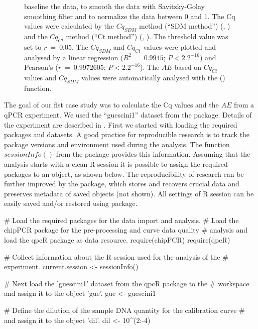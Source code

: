 \begin{figure}[htbp]
{baseline the data, to smooth the data with Savitzky-Golay smoothing filter and 
to normalize the data between 0 and 1.  The Cq values were 
calculated by the $Cq_{SDM}$ method (``SDM method'') (, 
) and the $Cq_{Ct}$ method (``Ct method'') (, 
). The threshold value was set to $r~=~0.05$. The $Cq_{SDM}$ 
and $Cq_{Ct}$ values were plotted and analysed by a linear regression 
($R^{2}~=~0.9945$; $P < 2.2^{-16}$) and Pearson's ($r~=~0.9972605$; $P < 
2.2^{-16}$). The $AE$ based on  $Cq_{Ct}$ values and  
$Cq_{SDM}$ values were automatically analysed with the  
() function.}
  \label{figure:dilution_Cq}
\end{figure}

The goal of our fist case study was to calculate the Cq values and the $AE$ from 
a qPCR experiment. We used the ``guescini1'' dataset from the  
package. Details of the experiment are described in \citet{guescini_2008}. First 
we started with loading the required packages and datasets. A good practice for 
reproducible research is to track the package versions and environment used 
during the analysis. The function $sessionInfo()$ from the  
package provides this information. Assuming that the analysis starts with a 
clean R session it is possible to assign the required packages to an object, as 
shown below. The reproducibility of research can be further improved by the 
 package, which stores and recovers crucial data and 
preserves metadata of saved objects (not shown). All settings of R session can 
be easily saved and/or restored using  package.

\begin{example}
# Load the required packages for the data import and analysis.
# Load the chipPCR package for the pre-processing and curve data quality
# analysis and load the qpcR package as data resource.
require(chipPCR)
require(qpcR)

# Collect information about the R session used for the analysis of the
# experiment.
current.session <- sessionInfo()

# Next load the 'guescini1' dataset from the qpcR package to the
# workspace and assign it to the object 'gue'.
gue <- guescini1

# Define the dilution of the sample DNA quantity for the calibration curve 
# and assign it to the object 'dil'.
dil <- 10^(2:-4)
\end{example}

